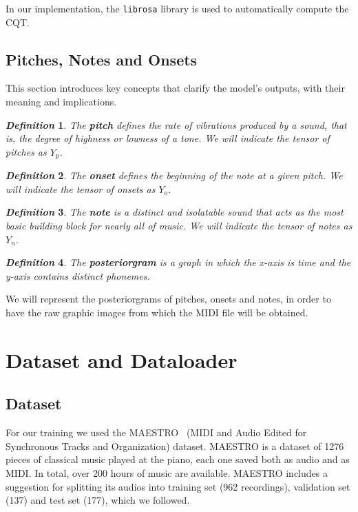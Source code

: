 \documentclass[10pt,twocolumn,letterpaper]{article}
\newtheorem{definition}{\textit{Definition}}
\begin{document}
In our implementation, the \texttt{librosa} library is used to  automatically compute the CQT.

\subsection{Pitches, Notes and Onsets}

This section introduces key concepts that clarify the model’s outputs, with their meaning and implications.

\begin{definition}
    The \textbf{pitch} defines the rate of vibrations produced by a sound, that is, the degree of highness or lowness of a tone. We will indicate the tensor of pitches as $Y_p$.
\end{definition}

\begin{definition}
    The \textbf{onset} defines the beginning of the note at a given pitch. We will indicate the tensor of onsets as $Y_o$.
\end{definition}

\begin{definition}
    The \textbf{note} is a distinct and isolatable sound that acts as the most basic building block for nearly all of music. We will indicate the tensor of notes as $Y_n$.
\end{definition}

\begin{definition}
    The \textbf{posteriorgram} is a graph in which the x-axis is time and the y-axis contains distinct phonemes.
\end{definition}

We will represent the posteriorgrams of pitches, onsets and notes, in order to have the raw graphic images from which the MIDI file will be obtained.

\section{Dataset and Dataloader}\label{sec:dataset}
\subsection{Dataset}

For our training we used the MAESTRO~\cite{maestro} (MIDI and Audio Edited for Synchronous Tracks and Organization) dataset.
MAESTRO is a dataset of \num{1276} pieces of classical music played at the piano, each one saved both as audio and as MIDI.
In total, over \num{200} hours of music are available.
MAESTRO includes a suggestion for splitting its audios into training set (\num{962} recordings), validation set (\num{137}) and test set (\num{177}), which we followed.
\end{document}
